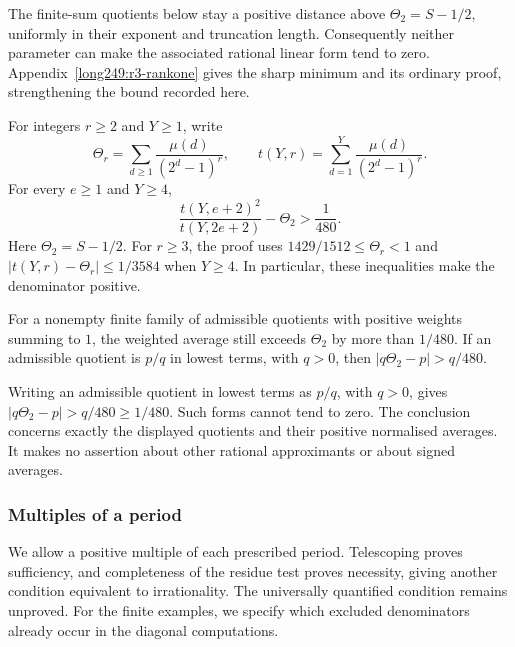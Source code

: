 The finite-sum quotients below stay a positive distance above
$\Theta_2=S-1/2$, uniformly in their exponent and truncation length.
Consequently neither parameter can make the associated rational
linear form tend to zero. Appendix~\ref{long249:r3-rankone} gives
the sharp minimum and its ordinary proof, strengthening the bound
recorded here.

\begin{thm}\label{thm:uniform-positive-gap-rank-one}
For integers $r\ge2$ and $Y\ge1$, write
\[
 \Theta_r=\sum_{d\ge1}\frac{\mu(d)}{(2^d-1)^r},
 \qquad t(Y,r)=\sum_{d=1}^{Y}\frac{\mu(d)}{(2^d-1)^r}.
\]
For every $e\ge1$ and $Y\ge4$,
\[
 \frac{t(Y,e+2)^2}{t(Y,2e+2)}-\Theta_2>\frac1{480}.
\]
Here $\Theta_2=S-1/2$. For $r\ge3$, the proof uses
$1429/1512\le\Theta_r<1$ and
$|t(Y,r)-\Theta_r|\le1/3584$ when $Y\ge4$.
In particular, these inequalities make the denominator positive.
\end{thm}

\begin{prop}\label{prop:bound-preserved-positive-normalised-averaging}
For a nonempty finite family of admissible quotients with positive
weights summing to $1$, the weighted average still exceeds $\Theta_2$
by more than $1/480$. If an admissible quotient is $p/q$ in lowest terms,
with $q>0$, then $|q\Theta_2-p|>q/480$.
\end{prop}

\begin{obs}
Writing an admissible quotient in lowest terms as $p/q$, with $q>0$,
gives $|q\Theta_2-p|>q/480\ge1/480$. Such forms cannot tend to zero.
The conclusion concerns exactly the displayed quotients and their positive
normalised averages. It makes no assertion about other rational
approximants or about signed averages.
\end{obs}

\subsubsection{Multiples of a period}

We allow a positive multiple of each prescribed period. Telescoping
proves sufficiency, and completeness of the residue test proves
necessity, giving another condition equivalent to irrationality.
The universally quantified condition remains unproved. For the finite
examples, we specify which excluded denominators already occur in the
diagonal computations.

